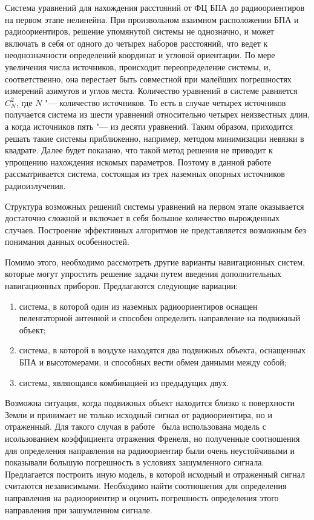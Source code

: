\documentclass[../main.tex]{subfiles}
\begin{document}
Система уравнений для нахождения расстояний от ФЦ БПА до радиоориентиров на первом этапе нелинейна. При произвольном взаимном расположении БПА и радиоориентиров, решение упомянутой системы не однозначно, и может включать в себя от одного до четырех наборов расстояний, что ведет к неоднозначности определений координат и угловой ориентации. По мере увеличения числа источников, происходит переопределение системы, и, соответственно, она перестает быть совместной при малейших погрешностях измерений азимутов и углов места. Количество уравнений в системе равняется $C_N^2$, где $N$ "--- количество источников. То есть в случае четырех источников получается система из шести уравнений относительно четырех неизвестных длин, а когда источников пять "--- из десяти уравнений. Таким образом, приходится решать такие системы приближенно, например, методом минимизации невязки в квадрате. Далее будет показано, что такой метод решения не приводит к упрощению нахождения искомых параметров. Поэтому в данной работе рассматривается система, состоящая из трех наземных опорных источников радиоизлучения.

Структура возможных решений системы уравнений на первом этапе оказывается достаточно сложной и включает в себя большое количество вырожденных случаев. Построение эффективных алгоритмов не представляется возможным без понимания данных особенностей.

Помимо этого, необходимо рассмотреть другие варианты навигационных систем, которые могут упростить решение задачи путем введения дополнительных навигационных приборов. Предлагаются следующие вариации:
\begin{enumerate}
    \item система, в которой один из наземных радиоориентиров оснащен пеленгаторной антенной и способен определить направление на подвижный объект;
    \item система, в которой в воздухе находятся два подвижных объекта, оснащенных БПА и высотомерами, и способных вести обмен данными между собой;
    \item система, являющаяся комбинацией из предыдущих двух.
\end{enumerate}

Возможна ситуация, когда подвижных объект находится близко к поверхности Земли и принимает не только исходный сигнал от радиоориентира, но и отраженный. Для такого случая в работе~\cite{VINOGRADOV:2017} была использована модель с исользованием коэффициента отражения Френеля, но полученные соотношения для определения направления на радиоориентир были очень неустойчивыми и показывали большую погрешность в условиях зашумленного сигнала. Предлагается построить иную модель, в которой исходный и отраженный сигнал считаются независимыми. Необходимо найти соотношения для определения направления на радиоориентир и оценить погрешность определения этого направления при зашумленном сигнале.
\end{document}
